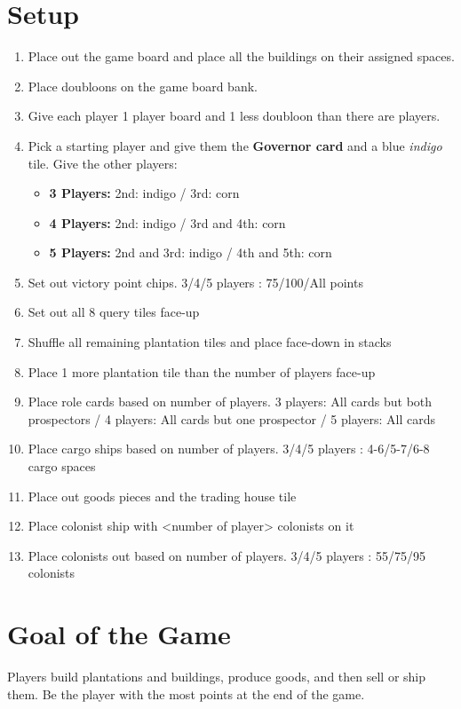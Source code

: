 \documentclass[12pt]{article}
\newenvironment{enumerateCustom}
{\begin{enumerate}
  \setlength{\itemsep}{1pt}
  \setlength{\parskip}{0pt}
  \setlength{\parsep}{0pt}}
{\end{enumerate}}
\newenvironment{itemizeCustom}
{\begin{itemize}
  \setlength{\itemsep}{1pt}
  \setlength{\parskip}{0pt}
  \setlength{\parsep}{0pt}}
{\end{itemize}}
\begin{document}
\begin{mdframed}[style = customFrame]
\begin{multicols*}{2}

\section*{Setup}
\begin{enumerateCustom}
	\item Place out the game board and place all the buildings on their assigned spaces.
	\item Place doubloons on the game board bank.
	\item Give each player 1 player board and 1 less doubloon than there are players.
	\item Pick a starting player and give them the \textbf{Governor card} and a blue \emph{indigo} tile. Give the other players:
		\begin{itemizeCustom}
			\item \textbf{3 Players:} 2nd: indigo / 3rd: corn
			\item \textbf{4 Players:} 2nd: indigo / 3rd and 4th: corn
			\item \textbf{5 Players:} 2nd and 3rd: indigo / 4th and 5th: corn
		\end{itemizeCustom}
	\item Set out victory point chips. 3/4/5 players : 75/100/All points
	\item Set out all 8 query tiles face-up
	\item Shuffle all remaining plantation tiles and place face-down in stacks
	\item Place 1 more plantation tile than the number of players face-up
	\item Place role cards based on number of players. 3 players: All cards but both prospectors / 4 players: All cards but one prospector / 5 players: All cards
	\item Place cargo ships based on number of players. 3/4/5 players : 4-6/5-7/6-8 cargo spaces
	\item Place out goods pieces and the trading house tile
	\item Place colonist ship with <number of player> colonists on it
	\item Place colonists out based on number of players. 3/4/5 players : 55/75/95 colonists
\end{enumerateCustom}

\section*{Goal of the Game}
Players build plantations and buildings, produce goods, and then sell or ship them. Be the player with the most points at the end of the game.


\end{multicols*}
\end{mdframed}
\end{document}
